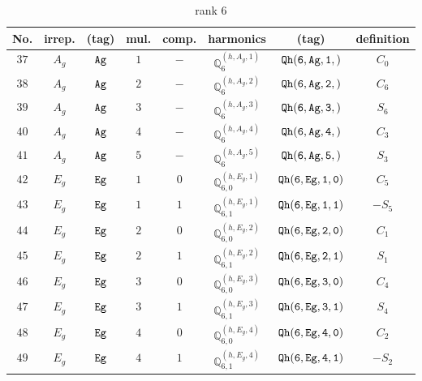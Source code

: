 \documentclass[fleqn,8pt]{jsarticle}
\begin{document}
\begin{table}[ht!]
\begin{center}
\caption{rank 6}
\renewcommand{\arraystretch}{1.3}
\begin{tabular}{cccccccc} \hline \hline
No. & irrep. & (tag) & mul. & comp. & harmonics & (tag) & definition \\ \hline
$ 37 $ & $ A_{g} $ & $ {\tt Ag} $ & $ 1 $ & $ - $ & $ \mathbb{Q}_{6}^{(h,A_{g},1)} $ & $ {\tt Qh(6,Ag,1,)} $ & $ C_{0} $ \\
$ 38 $ & $ A_{g} $ & $ {\tt Ag} $ & $ 2 $ & $ - $ & $ \mathbb{Q}_{6}^{(h,A_{g},2)} $ & $ {\tt Qh(6,Ag,2,)} $ & $ C_{6} $ \\
$ 39 $ & $ A_{g} $ & $ {\tt Ag} $ & $ 3 $ & $ - $ & $ \mathbb{Q}_{6}^{(h,A_{g},3)} $ & $ {\tt Qh(6,Ag,3,)} $ & $ S_{6} $ \\
$ 40 $ & $ A_{g} $ & $ {\tt Ag} $ & $ 4 $ & $ - $ & $ \mathbb{Q}_{6}^{(h,A_{g},4)} $ & $ {\tt Qh(6,Ag,4,)} $ & $ C_{3} $ \\
$ 41 $ & $ A_{g} $ & $ {\tt Ag} $ & $ 5 $ & $ - $ & $ \mathbb{Q}_{6}^{(h,A_{g},5)} $ & $ {\tt Qh(6,Ag,5,)} $ & $ S_{3} $ \\
$ 42 $ & $ E_{g} $ & $ {\tt Eg} $ & $ 1 $ & $ 0 $ & $ \mathbb{Q}_{6,0}^{(h,E_{g},1)} $ & $ {\tt Qh(6,Eg,1,0)} $ & $ C_{5} $ \\
$ 43 $ & $ E_{g} $ & $ {\tt Eg} $ & $ 1 $ & $ 1 $ & $ \mathbb{Q}_{6,1}^{(h,E_{g},1)} $ & $ {\tt Qh(6,Eg,1,1)} $ & $ - S_{5} $ \\
$ 44 $ & $ E_{g} $ & $ {\tt Eg} $ & $ 2 $ & $ 0 $ & $ \mathbb{Q}_{6,0}^{(h,E_{g},2)} $ & $ {\tt Qh(6,Eg,2,0)} $ & $ C_{1} $ \\
$ 45 $ & $ E_{g} $ & $ {\tt Eg} $ & $ 2 $ & $ 1 $ & $ \mathbb{Q}_{6,1}^{(h,E_{g},2)} $ & $ {\tt Qh(6,Eg,2,1)} $ & $ S_{1} $ \\
$ 46 $ & $ E_{g} $ & $ {\tt Eg} $ & $ 3 $ & $ 0 $ & $ \mathbb{Q}_{6,0}^{(h,E_{g},3)} $ & $ {\tt Qh(6,Eg,3,0)} $ & $ C_{4} $ \\
$ 47 $ & $ E_{g} $ & $ {\tt Eg} $ & $ 3 $ & $ 1 $ & $ \mathbb{Q}_{6,1}^{(h,E_{g},3)} $ & $ {\tt Qh(6,Eg,3,1)} $ & $ S_{4} $ \\
$ 48 $ & $ E_{g} $ & $ {\tt Eg} $ & $ 4 $ & $ 0 $ & $ \mathbb{Q}_{6,0}^{(h,E_{g},4)} $ & $ {\tt Qh(6,Eg,4,0)} $ & $ C_{2} $ \\
$ 49 $ & $ E_{g} $ & $ {\tt Eg} $ & $ 4 $ & $ 1 $ & $ \mathbb{Q}_{6,1}^{(h,E_{g},4)} $ & $ {\tt Qh(6,Eg,4,1)} $ & $ - S_{2} $ \\
 \hline \hline
\end{tabular}
\end{center}
\end{table}
\end{document}
